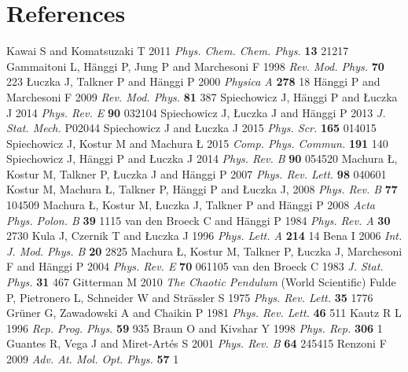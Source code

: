 \documentclass[12pt]{iopart}
\begin{document}
\section*{References}
\begin{thebibliography}{99}
Kawai S and Komatsuzaki T 2011 \textit{Phys. Chem. Chem. Phys.} \textbf{13} 21217
Gammaitoni L, H\"{a}nggi P, Jung P and Marchesoni F 1998 \textit{Rev. Mod. Phys.} \textbf{70} 223
{\L}uczka J, Talkner P and H\"anggi P 2000 \textit{Physica A} \textbf{278} 18
H\"anggi P and Marchesoni F 2009 \textit{Rev. Mod. Phys.} \textbf{81} 387
Spiechowicz J, H\"anggi P and {\L}uczka J 2014 \textit{Phys. Rev. E} \textbf{90} 032104
Spiechowicz J, {\L}uczka J and H\"anggi P 2013 \textit{J. Stat. Mech.} P02044
Spiechowicz J and {\L}uczka J 2015 \textit{Phys. Scr.} \textbf{165} 014015
Spiechowicz J, Kostur M and Machura {\L} 2015 \textit{Comp. Phys. Commun.} \textbf{191} 140
Spiechowicz J, H\"anggi P and {\L}uczka J 2014 \textit{Phys. Rev. B} \textbf{90} 054520
Machura {\L}, Kostur M, Talkner P, {\L}uczka J and H\"anggi P 2007 \textit{Phys. Rev. Lett.} {\bf 98} 040601
Kostur M, Machura {\L}, Talkner P, H\"anggi P and {\L}uczka J, 2008 \textit{Phys. Rev. B} \textbf{77} 104509
Machura {\L}, Kostur M, {\L}uczka J, Talkner P and H\"anggi P 2008 \textit{Acta Phys. Polon. B} {\bf 39} 1115
van den Broeck C and H\"anggi P 1984 \textit{Phys. Rev. A} \textbf{30} 2730
Kula J, Czernik T and {\L}uczka J 1996 \textit{Phys. Lett. A} \textbf{214} 14
Bena I 2006 \textit{Int. J. Mod. Phys. B} \textbf{20} 2825
Machura {\L}, Kostur M, Talkner P, {\L}uczka J, Marchesoni F and H\"anggi P 2004 \textit{Phys. Rev. E} \textbf{70} 061105
van den Broeck C 1983 \textit{J. Stat. Phys.} \textbf{31} 467
Gitterman M 2010 \textit{The Chaotic Pendulum} (World Scientific)
Fulde P, Pietronero L, Schneider W and Str\"assler S 1975 \textit{Phys. Rev. Lett.} \textbf{35} 1776
Gr\"uner G, Zawadowski A and Chaikin P 1981 \textit{Phys. Rev. Lett.} \textbf{46} 511
Kautz R L 1996 \textit{Rep. Prog. Phys.} \textbf{59} 935
Braun O and Kivshar Y 1998 \textit{Phys. Rep.} \textbf{306} 1
Guantes R, Vega J and Miret-Art\'es S 2001 \textit{Phys. Rev. B} \textbf{64} 245415
 Renzoni F 2009   \textit{Adv. At. Mol. Opt. Phys.} \textbf{ 57}  1  


\end{thebibliography}
\end{document}
